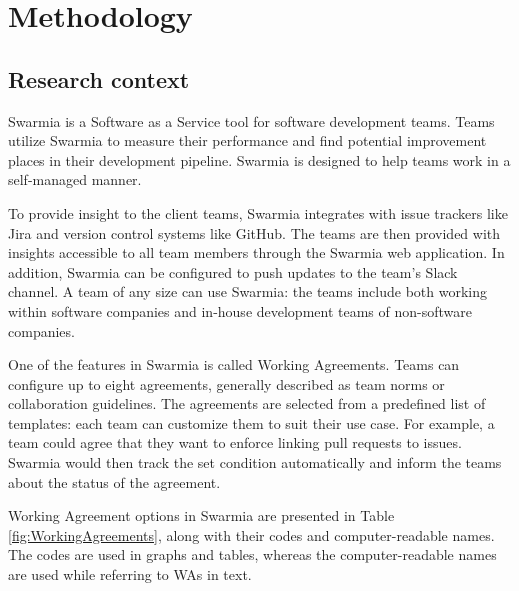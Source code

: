 \chapter{Methodology}

\section{Research context}

Swarmia is a Software as a Service tool for software development teams. Teams utilize Swarmia to measure their performance and find potential improvement places in their development pipeline. Swarmia is designed to help teams work in a self-managed manner.

To provide insight to the client teams, Swarmia integrates with issue trackers like Jira and version control systems like GitHub. The teams are then provided with insights accessible to all team members through the Swarmia web application. In addition, Swarmia can be configured to push updates to the team's Slack channel. A team of any size can use Swarmia: the teams include both working within software companies and in-house development teams of non-software companies. 

One of the features in Swarmia is called Working Agreements. Teams can configure up to eight agreements, generally described as team norms or collaboration guidelines. The agreements are selected from a predefined list of templates: each team can customize them to suit their use case. For example, a team could agree that they want to enforce linking pull requests to issues. Swarmia would then track the set condition automatically and inform the teams about the status of the agreement. 



Working Agreement options in Swarmia are presented in Table \ref{fig:WorkingAgreements}, along with their codes and computer-readable names. The codes are used in graphs and tables, whereas the computer-readable names are used while referring to WAs in text.

